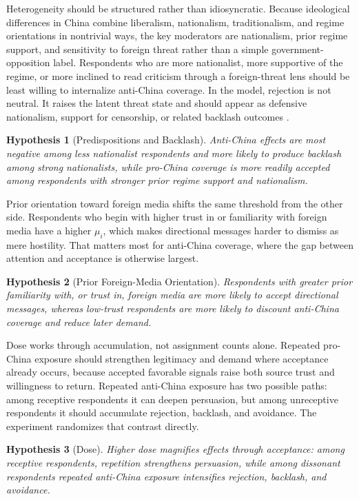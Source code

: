 \documentclass[12pt,american]{article}
\newtheorem{hypothesis}{Hypothesis}
\begin{document}
	Heterogeneity should be structured rather than idiosyncratic. Because ideological differences in China combine liberalism, nationalism, traditionalism, and regime orientations in nontrivial ways, the key moderators are nationalism, prior regime support, and sensitivity to foreign threat rather than a simple government-opposition label. Respondents who are more nationalist, more supportive of the regime, or more inclined to read criticism through a foreign-threat lens should be least willing to internalize anti-China coverage. In the model, rejection is not neutral. It raises the latent threat state and should appear as defensive nationalism, support for censorship, or related backlash outcomes \citep{wangwestwood2024,Wu2026}.
	\begin{singlespace}
		\begin{hypothesis}[Predispositions and Backlash]
			Anti-China effects are most negative among less nationalist respondents and more likely to produce backlash among strong nationalists, while pro-China coverage is more readily accepted among respondents with stronger prior regime support and nationalism.
		\end{hypothesis}
	\end{singlespace}
	
	Prior orientation toward foreign media shifts the same threshold from the other side. Respondents who begin with higher trust in or familiarity with foreign media have a higher \(\mu_i\), which makes directional messages harder to dismiss as mere hostility. That matters most for anti-China coverage, where the gap between attention and acceptance is otherwise largest.
	\begin{singlespace}
		\begin{hypothesis}[Prior Foreign-Media Orientation]
			Respondents with greater prior familiarity with, or trust in, foreign media are more likely to accept directional messages, whereas low-trust respondents are more likely to discount anti-China coverage and reduce later demand.
		\end{hypothesis}
	\end{singlespace}
	
	Dose works through accumulation, not assignment counts alone. Repeated pro-China exposure should strengthen legitimacy and demand where acceptance already occurs, because accepted favorable signals raise both source trust and willingness to return. Repeated anti-China exposure has two possible paths: among receptive respondents it can deepen persuasion, but among unreceptive respondents it should accumulate rejection, backlash, and avoidance. The experiment randomizes that contrast directly.
	\begin{singlespace}
		\begin{hypothesis}[Dose]
			Higher dose magnifies effects through acceptance: among receptive respondents, repetition strengthens persuasion, while among dissonant respondents repeated anti-China exposure intensifies rejection, backlash, and avoidance.
		\end{hypothesis}
	\end{singlespace}
	
\end{document}
